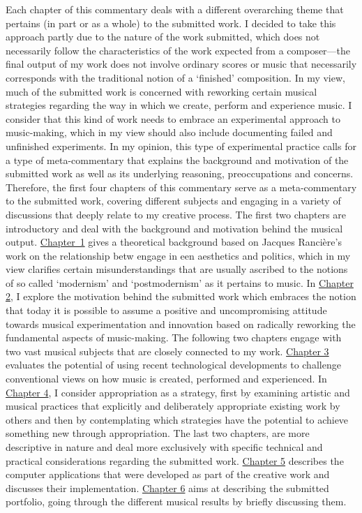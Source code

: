 Each chapter of this commentary deals with a different overarching theme that pertains (in part or as a whole) to the submitted work. I decided to take this approach partly due to the nature of the work submitted, which does not necessarily follow the characteristics of the work expected from a composer---the final output of my work does not involve ordinary scores or music that necessarily corresponds with the traditional notion of a `finished' composition. In my view, much of the submitted work is concerned with reworking certain musical strategies regarding the way in which we create, perform and experience music. I consider that this kind of work needs to embrace an experimental approach to music-making, which in my view should also include documenting failed and unfinished experiments. In my opinion, this type of experimental practice calls for a type of meta-commentary that explains the background and motivation of the submitted work as well as its underlying reasoning, preoccupations and concerns. Therefore, the first four chapters of this commentary serve as a meta-commentary to the submitted work, covering different subjects and engaging in a variety of discussions that deeply relate to my creative process. The first two chapters are introductory and deal with the background and motivation behind the musical output. \hyperlink{chapter1}{\mbox{Chapter 1}} gives a theoretical background based on Jacques Ranci\`{e}re's work on the relationship betw engage in een aesthetics and politics, which in my view clarifies certain misunderstandings that are usually ascribed to the notions of so called `modernism' and `postmodernism' as it pertains to music. In \hyperlink{chapter2}{Chapter 2}, I explore the motivation behind the submitted work which embraces the notion that today it is possible to assume a positive and uncompromising attitude towards musical experimentation and innovation based on radically reworking the fundamental aspects of music-making. The following two chapters engage with two vast musical subjects that are closely connected to my work. \hyperlink{chapter3}{Chapter 3} evaluates the potential of using recent technological developments to challenge conventional views on how music is created, performed and experienced. In \hyperlink{chapter4}{Chapter 4}, I consider appropriation as a strategy, first by examining artistic and musical practices that explicitly and deliberately appropriate existing work by others and then by contemplating which strategies have the potential to achieve something new through appropriation. The last two chapters, are more descriptive in nature and deal more exclusively with specific technical and practical considerations regarding the submitted work. \hyperlink{chapter5}{Chapter 5} describes the computer applications that were developed as part of the creative work and discusses their implementation. \hyperlink{chapter6}{Chapter 6} aims at describing the submitted portfolio, going through the different musical results by briefly discussing them.

